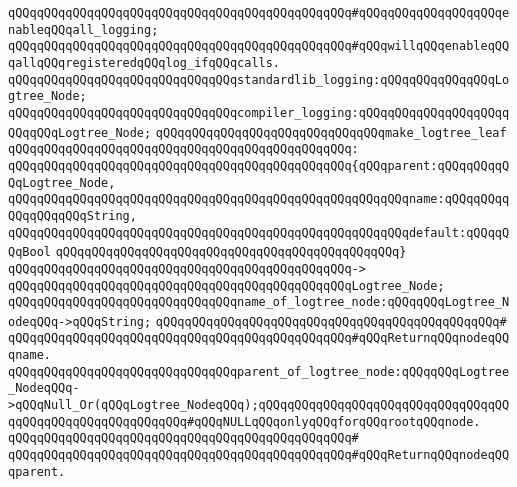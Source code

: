 \verb|qQQqqQQqqQQqqQQqqQQqqQQqqQQqqQQqqQQqqQQqqQQqqQQq#qQQqqQQqqQQqqQQqqQQqenableqQQqall_logging;|\newline
\verb|qQQqqQQqqQQqqQQqqQQqqQQqqQQqqQQqqQQqqQQqqQQqqQQq#qQQqwillqQQqenableqQQqallqQQqregisteredqQQqlog_ifqQQqcalls.|\newline
\newline
\verb|qQQqqQQqqQQqqQQqqQQqqQQqqQQqqQQqstandardlib_logging:qQQqqQQqqQQqqQQqLogtree_Node;|\newline
\verb|qQQqqQQqqQQqqQQqqQQqqQQqqQQqqQQqcompiler_logging:qQQqqQQqqQQqqQQqqQQqqQQqqQQqLogtree_Node;|\newline
\newline
\verb|qQQqqQQqqQQqqQQqqQQqqQQqqQQqqQQqmake_logtree_leaf|\newline
\verb|qQQqqQQqqQQqqQQqqQQqqQQqqQQqqQQqqQQqqQQqqQQqqQQq:|\newline
\verb|qQQqqQQqqQQqqQQqqQQqqQQqqQQqqQQqqQQqqQQqqQQqqQQq{qQQqparent:qQQqqQQqqQQqLogtree_Node,|\newline
\verb|qQQqqQQqqQQqqQQqqQQqqQQqqQQqqQQqqQQqqQQqqQQqqQQqqQQqqQQqname:qQQqqQQqqQQqqQQqqQQqString,|\newline
\verb|qQQqqQQqqQQqqQQqqQQqqQQqqQQqqQQqqQQqqQQqqQQqqQQqqQQqqQQqdefault:qQQqqQQqBool|\newline
\verb|qQQqqQQqqQQqqQQqqQQqqQQqqQQqqQQqqQQqqQQqqQQqqQQq}|\newline
\verb|qQQqqQQqqQQqqQQqqQQqqQQqqQQqqQQqqQQqqQQqqQQqqQQq->|\newline
\verb|qQQqqQQqqQQqqQQqqQQqqQQqqQQqqQQqqQQqqQQqqQQqqQQqLogtree_Node;|\newline
\newline
\verb|qQQqqQQqqQQqqQQqqQQqqQQqqQQqqQQqname_of_logtree_node:qQQqqQQqLogtree_NodeqQQq->qQQqString;|\newline
\verb|qQQqqQQqqQQqqQQqqQQqqQQqqQQqqQQqqQQqqQQqqQQqqQQq#|\newline
\verb|qQQqqQQqqQQqqQQqqQQqqQQqqQQqqQQqqQQqqQQqqQQqqQQq#qQQqReturnqQQqnodeqQQqname.|\newline
\newline
\verb|qQQqqQQqqQQqqQQqqQQqqQQqqQQqqQQqparent_of_logtree_node:qQQqqQQqLogtree_NodeqQQq->qQQqNull_Or(qQQqLogtree_NodeqQQq);qQQqqQQqqQQqqQQqqQQqqQQqqQQqqQQqqQQqqQQqqQQqqQQqqQQqqQQqqQQq#qQQqNULLqQQqonlyqQQqforqQQqrootqQQqnode.|\newline
\verb|qQQqqQQqqQQqqQQqqQQqqQQqqQQqqQQqqQQqqQQqqQQqqQQq#|\newline
\verb|qQQqqQQqqQQqqQQqqQQqqQQqqQQqqQQqqQQqqQQqqQQqqQQq#qQQqReturnqQQqnodeqQQqparent.|\newline
